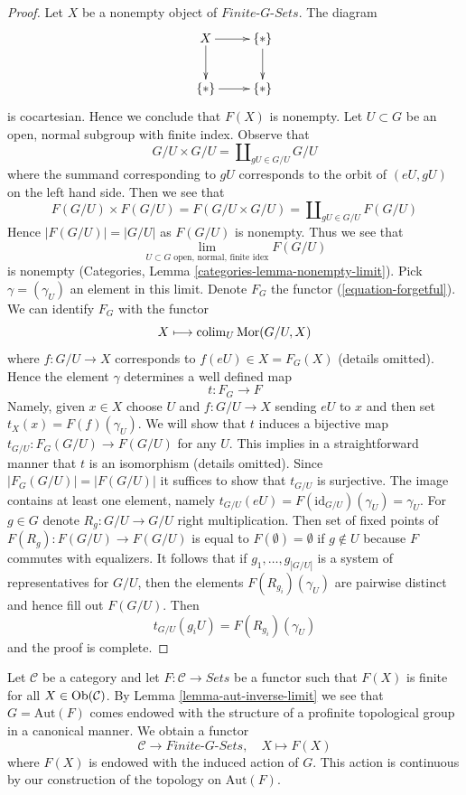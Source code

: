 \begin{proof}
Let $X$ be a nonempty object of $\textit{Finite-}G\textit{-Sets}$.
The diagram
$$
\xymatrix{
X \ar[r] \ar[d] & \{*\} \ar[d] \\
\{*\} \ar[r] & \{*\}
}
$$
is cocartesian. Hence we conclude that $F(X)$ is nonempty.
Let $U \subset G$ be an open, normal subgroup with finite index.
Observe that
$$
G/U \times G/U = \coprod\nolimits_{gU \in G/U} G/U
$$
where the summand corresponding to $gU$ corresponds to the orbit of
$(eU, gU)$ on the left hand side. Then we see that
$$
F(G/U) \times F(G/U) = F(G/U \times G/U) = \coprod\nolimits_{gU \in G/U} F(G/U)
$$
Hence $|F(G/U)| = |G/U|$ as $F(G/U)$ is nonempty. Thus we see that
$$
\lim_{U \subset G\text{ open, normal, finite idex}} F(G/U)
$$
is nonempty (Categories, Lemma \ref{categories-lemma-nonempty-limit}).
Pick $\gamma = (\gamma_U)$ an element in this limit.
Denote $F_G$ the functor (\ref{equation-forgetful}). We can identify
$F_G$ with the functor
$$
X \longmapsto \mathop{\mathrm{colim}}\nolimits_U \mathop{\mathrm{Mor}}\nolimits(G/U, X)
$$
where $f : G/U \to X$ corresponds to $f(eU) \in X = F_G(X)$
(details omitted). Hence the element $\gamma$ determines
a well defined map
$$
t : F_G \longrightarrow F
$$
Namely, given $x \in X$ choose $U$ and $f : G/U \to X$ sending
$eU$ to $x$ and then set $t_X(x) = F(f)(\gamma_U)$.
We will show that $t$ induces a bijective map
$t_{G/U} : F_G(G/U) \to F(G/U)$ for any $U$.
This implies in a straightforward manner that $t$
is an isomorphism (details omitted).
Since $|F_G(G/U)| = |F(G/U)|$ it suffices to show
that $t_{G/U}$ is surjective. The image contains at least
one element, namely
$t_{G/U}(eU) = F(\text{id}_{G/U})(\gamma_U) = \gamma_U$.
For $g \in G$ denote $R_g : G/U \to G/U$ right multiplication.
Then set of fixed points of $F(R_g) : F(G/U) \to F(G/U)$
is equal to $F(\emptyset) = \emptyset$ if $g \not \in U$ because $F$
commutes with equalizers. It follows that if
$g_1, \ldots, g_{|G/U|}$ is a system of representatives
for $G/U$, then the elements $F(R_{g_i})(\gamma_U)$ are pairwise distinct
and hence fill out $F(G/U)$. Then
$$
t_{G/U}(g_iU) = F(R_{g_i})(\gamma_U)
$$
and the proof is complete.
\end{proof}

\begin{example}
\label{example-from-C-F-to-G-sets}
Let $\mathcal{C}$ be a category and let $F : \mathcal{C} \to \textit{Sets}$
be a functor such that $F(X)$ is finite for all $X \in \mathop{\mathrm{Ob}}\nolimits(\mathcal{C})$.
By Lemma \ref{lemma-aut-inverse-limit} we see that $G = \text{Aut}(F)$
comes endowed with the structure of a profinite topological group in a
canonical manner. We obtain a functor
\begin{equation}
\label{equation-remember}
\mathcal{C} \longrightarrow \textit{Finite-}G\textit{-Sets},\quad
X \longmapsto F(X)
\end{equation}
where $F(X)$ is endowed with the induced action of $G$. This action
is continuous by our construction of the topology on $\text{Aut}(F)$.
\end{example}

